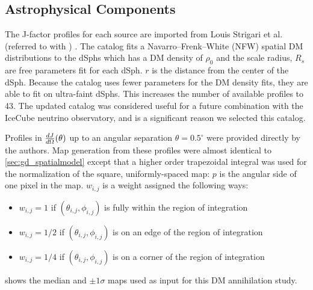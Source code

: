 \subsection{\J Astrophysical Components}\label{sec:mtd_spatialmodel}

The J-factor profiles for each source are imported from Louis Strigari et al. (referred to with \LS) \cite{DM_Strigari20}.
The \LS catalog fits a Navarro–Frenk–White (NFW) \cite{NFWProfile} spatial DM distributions to the dSphs which has a DM density of
\nfwProfile
$\rho_0$ and the scale radius, $R_s$ are free parameters fit for each dSph.
$r$ is the distance from the center of the dSph.
Because the \LS catalog uses fewer parameters for the DM density fits, they are able to fit on ultra-faint dSphs.
This increases the number of available profiles to 43.
The updated catalog was considered useful for a future combination with the IceCube neutrino observatory, and is a significant reason we selected this catalog.

Profiles in $\frac{dJ}{d\Omega} (\theta)$ up to an angular separation $\theta = 0.5^{\circ}$ were provided directly by the authors.
Map generation from these profiles were almost identical to \cref{sec:gd_spatialmodel} except that a higher order trapezoidal integral was used for the normalization of the square, uniformly-spaced map:
\TrapIntegral
$p$ is the angular side of one pixel in the map.
$w_{i,j}$ is a weight assigned the following ways:
\begin{itemize}
    \item[] $w_{i,j} = 1$ if $(\theta_{i,j}, \phi_{i,j})$ is fully within the region of integration
    \item[] $w_{i,j} = 1/2$ if $(\theta_{i,j}, \phi_{i,j})$ is on an edge of the region of integration
    \item[] $w_{i,j} = 1/4$ if $(\theta_{i,j}, \phi_{i,j})$ is on a corner of the region of integration
\end{itemize}
 shows the median and $\pm1\sigma$ maps used as input for this DM annihilation study.

